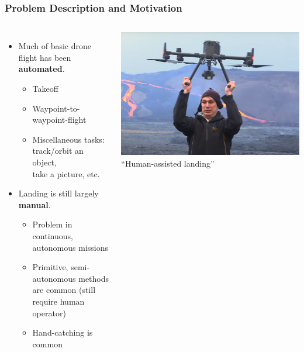 \documentclass[aspectratio=169]{rubeamer}
\newif\ifpause
\newcommand{\mypause}{\ifpause \pause \fi}
\begin{document}
\begin{frame}
  \frametitle{Problem Description and Motivation}
  \begin{columns}
    \begin{itemize}
      \item Much of basic drone flight has been \textbf{automated}.
      \mypause
      \begin{itemize}
        \item Takeoff
        \item Waypoint-to-waypoint-flight
        \item Miscellaneous tasks:\\track/orbit an object,\\take a picture, etc.
      \end{itemize}
      \mypause
      \item Landing is still largely \textbf{manual}.
      \mypause
      \begin{itemize}
        \item Problem in continuous, autonomous missions
        \item Primitive, semi-autonomous methods are common (still require human operator)
        \item Hand-catching is common
      \end{itemize}
    \end{itemize}
    \centering
    \mypause
    \includegraphics[width=\textwidth]{human_assisted_landing}\\
    ``Human-assisted landing''
  \end{columns}
\end{frame}
\end{document}

